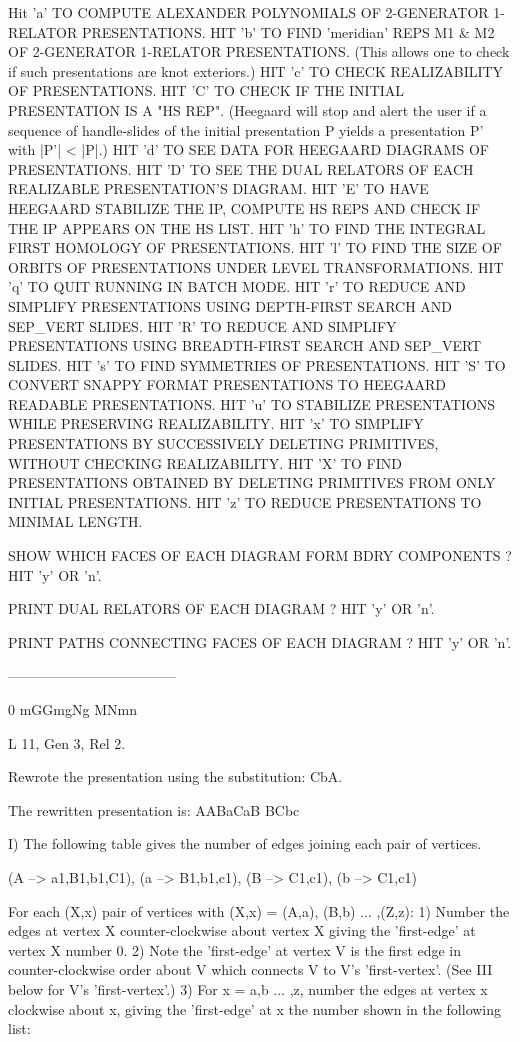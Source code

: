 \documentclass{article}%
\theoremstyle{plain}
\theoremstyle{plain}
\theoremstyle{definition}
\numberwithin{equation}{section}
\begin{document}
Hit 'a' TO COMPUTE ALEXANDER POLYNOMIALS OF 2-GENERATOR 1-RELATOR PRESENTATIONS.
HIT 'b' TO FIND 'meridian' REPS M1 & M2 OF 2-GENERATOR 1-RELATOR PRESENTATIONS.
    (This allows one to check if such presentations are knot exteriors.)
HIT 'c' TO CHECK REALIZABILITY OF PRESENTATIONS.
HIT 'C' TO CHECK IF THE INITIAL PRESENTATION IS A "HS REP". (Heegaard will stop and alert the user if
    a sequence of handle-slides of the initial presentation P yields a presentation P' with |P'| < |P|.)
HIT 'd' TO SEE DATA FOR HEEGAARD DIAGRAMS OF PRESENTATIONS.
HIT 'D' TO SEE THE DUAL RELATORS OF EACH REALIZABLE PRESENTATION'S DIAGRAM.
HIT 'E' TO HAVE HEEGAARD STABILIZE THE IP, COMPUTE HS REPS AND CHECK IF THE IP APPEARS ON THE HS LIST.
HIT 'h' TO FIND THE INTEGRAL FIRST HOMOLOGY OF PRESENTATIONS.
HIT 'l' TO FIND THE SIZE OF ORBITS OF PRESENTATIONS UNDER LEVEL TRANSFORMATIONS.
HIT 'q' TO QUIT RUNNING IN BATCH MODE.
HIT 'r' TO REDUCE AND SIMPLIFY PRESENTATIONS USING DEPTH-FIRST SEARCH AND SEP_VERT SLIDES.
HIT 'R' TO REDUCE AND SIMPLIFY PRESENTATIONS USING BREADTH-FIRST SEARCH AND SEP_VERT SLIDES.
HIT 's' TO FIND SYMMETRIES OF PRESENTATIONS.
HIT 'S' TO CONVERT SNAPPY FORMAT PRESENTATIONS TO HEEGAARD READABLE PRESENTATIONS.
HIT 'u' TO STABILIZE PRESENTATIONS WHILE PRESERVING REALIZABILITY.
HIT 'x' TO SIMPLIFY PRESENTATIONS BY SUCCESSIVELY DELETING PRIMITIVES, WITHOUT CHECKING REALIZABILITY.
HIT 'X' TO FIND PRESENTATIONS OBTAINED BY DELETING PRIMITIVES FROM ONLY INITIAL PRESENTATIONS.
HIT 'z' TO REDUCE PRESENTATIONS TO MINIMAL LENGTH.


SHOW WHICH FACES OF EACH DIAGRAM FORM BDRY COMPONENTS ?  HIT 'y' OR 'n'.

PRINT DUAL RELATORS OF EACH DIAGRAM ? HIT 'y' OR 'n'.

PRINT PATHS CONNECTING FACES OF EACH DIAGRAM ? HIT 'y' OR 'n'.

------------------------------------

0
    mGGmgNg
    MNmn

L 11, Gen 3, Rel 2.

Rewrote the presentation using the substitution: CbA.

 The rewritten presentation is:
    AABaCaB
    BCbc


I) The following table gives the number of edges joining each pair of vertices.

(A --> a1,B1,b1,C1), (a --> B1,b1,c1), (B --> C1,c1), (b --> C1,c1)

For each (X,x) pair of vertices with (X,x) = (A,a), (B,b) ... ,(Z,z):
1) Number the edges at vertex X counter-clockwise about vertex X giving the 'first-edge' at vertex X number 0.
2) Note the 'first-edge' at vertex V is the first edge in counter-clockwise order about V which connects V to V's 'first-vertex'. (See III below for V's 'first-vertex'.)
3) For x = a,b ... ,z, number the edges at vertex x clockwise about x, giving the 'first-edge' at x the number shown in the following list:
\end{document}
